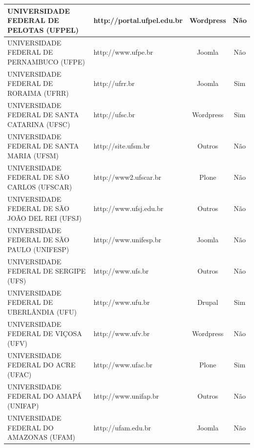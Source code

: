 \begin{quadro}[htb]
{\begin{tabular}{|l|l|c|c|}
			UNIVERSIDADE FEDERAL DE PELOTAS (UFPEL)                                        & http://portal.ufpel.edu.br        & Wordpress & Não           \\ \hline
			UNIVERSIDADE FEDERAL DE PERNAMBUCO (UFPE)                                      & http://www.ufpe.br                & Joomla    & Não           \\ \hline
			UNIVERSIDADE FEDERAL DE RORAIMA (UFRR)                                         & http://ufrr.br                    & Joomla    & Sim           \\ \hline
			UNIVERSIDADE FEDERAL DE SANTA CATARINA (UFSC)                                  & http://ufsc.br                    & Wordpress & Sim           \\ \hline
			UNIVERSIDADE FEDERAL DE SANTA MARIA (UFSM)                                     & http://site.ufsm.br               & Outros    & Não           \\ \hline
			UNIVERSIDADE FEDERAL DE SÃO CARLOS (UFSCAR)                                    & http://www2.ufscar.br             & Plone     & Não           \\ \hline
			UNIVERSIDADE FEDERAL DE SÃO JOÃO DEL REI (UFSJ)                                & http://www.ufsj.edu.br            & Outros    & Não           \\ \hline
			UNIVERSIDADE FEDERAL DE SÃO PAULO (UNIFESP)                                    & http://www.unifesp.br             & Joomla    & Não           \\ \hline
			UNIVERSIDADE FEDERAL DE SERGIPE (UFS)                                          & http://www.ufs.br                 & Outros    & Não           \\ \hline
			UNIVERSIDADE FEDERAL DE UBERLÂNDIA (UFU)                                       & http://www.ufu.br                 & Drupal    & Sim           \\ \hline
			UNIVERSIDADE FEDERAL DE VIÇOSA (UFV)                                           & http://www.ufv.br                 & Wordpress & Não           \\ \hline
			UNIVERSIDADE FEDERAL DO ACRE (UFAC)                                            & http://www.ufac.br                & Plone     & Sim           \\ \hline
			UNIVERSIDADE FEDERAL DO AMAPÁ (UNIFAP)                                         & http://www.unifap.br              & Outros    & Não           \\ \hline
			UNIVERSIDADE FEDERAL DO AMAZONAS (UFAM)                                        & http://ufam.edu.br                & Joomla    & Não           \\ \hline

\end{tabular}}
\end{quadro}
